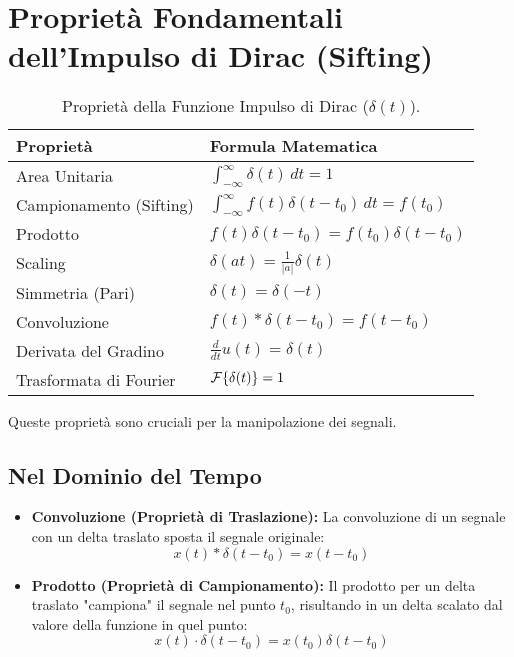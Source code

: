 \section{Proprietà Fondamentali dell'Impulso di Dirac (Sifting)}

\begin{table}[h!]
\centering
\caption{Proprietà della Funzione Impulso di Dirac ($\delta(t)$).}
\label{tab:dirac_properties}
\begin{tabular}{ll}
    \toprule
    \textbf{Proprietà} & \textbf{Formula Matematica} \\
    \midrule
    Area Unitaria & $\int_{-\infty}^{\infty} \delta(t) \,dt = 1$ \\
    \addlinespace
    Campionamento (Sifting) & $\int_{-\infty}^{\infty} f(t) \delta(t-t_0) \,dt = f(t_0)$ \\
    \addlinespace
    Prodotto & $f(t)\delta(t-t_0) = f(t_0)\delta(t-t_0)$ \\
    \addlinespace
    Scaling & $\delta(at) = \frac{1}{|a|} \delta(t)$ \\
    \addlinespace
    Simmetria (Pari) & $\delta(t) = \delta(-t)$ \\
    \addlinespace
    Convoluzione & $f(t) * \delta(t-t_0) = f(t-t_0)$ \\
    \addlinespace
    Derivata del Gradino & $\frac{d}{dt}u(t) = \delta(t)$ \\
    \addlinespace
    Trasformata di Fourier & $\mathcal{F}\{\delta(t)\} = 1$ \\
    \bottomrule
\end{tabular}
\end{table}

Queste proprietà sono cruciali per la manipolazione dei segnali.

\subsection*{Nel Dominio del Tempo}
\begin{itemize}
    \item \textbf{Convoluzione (Proprietà di Traslazione):} La convoluzione di un segnale con un delta traslato sposta il segnale originale:
    \begin{equation*}
        x(t) * \delta(t-t_0) = x(t-t_0)
    \end{equation*}
    
    \item \textbf{Prodotto (Proprietà di Campionamento):} Il prodotto per un delta traslato "campiona" il segnale nel punto $t_0$, risultando in un delta scalato dal valore della funzione in quel punto:
    \begin{equation*}
        x(t) \cdot \delta(t-t_0) = x(t_0) \delta(t-t_0)
    \end{equation*}
\end{itemize}

